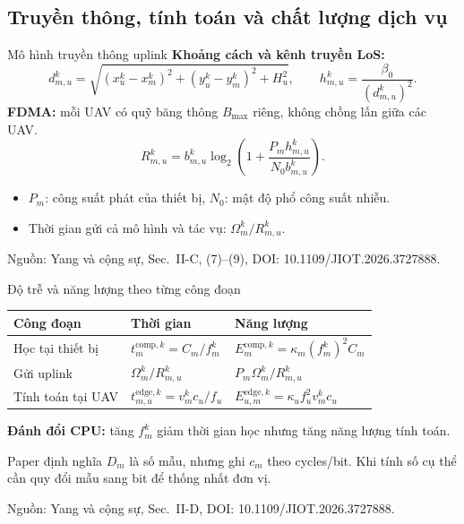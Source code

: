 \documentclass[aspectratio=169,11pt]{beamer}
\newcommand{\source}[1]{\par\vfill{\tiny\color{Muted}Nguồn: #1\par}}
\newcommand{\paperref}[1]{\source{Yang và cộng sự, Sec.~#1, DOI: 10.1109/JIOT.2026.3727888.}}
\begin{document}
\subsection{Truyền thông, tính toán và chất lượng dịch vụ}

\begin{frame}{Mô hình truyền thông uplink}
  \textbf{Khoảng cách và kênh truyền LoS:}
  \[
    d_{m,u}^k=\sqrt{(x_u^k-x_m^k)^2+(y_u^k-y_m^k)^2+H_u^2},
    \qquad h_{m,u}^k=\frac{\beta_0}{(d_{m,u}^k)^2}.
  \]
  \textbf{FDMA:} mỗi UAV có quỹ băng thông $B_{\max}$ riêng, không chồng lấn giữa các UAV.
  \[
    R_{m,u}^k=b_{m,u}^k\log_2\!\left(1+
          \frac{P_mh_{m,u}^k}{N_0b_{m,u}^k}\right).
  \]
  \begin{itemize}
    \item $P_m$: công suất phát của thiết bị, $N_0$: mật độ phổ công suất nhiễu.
    \item Thời gian gửi cả mô hình và tác vụ: $\Omega_m^k/R_{m,u}^k$.
  \end{itemize}
  \paperref{II-C, (7)--(9)}
\end{frame}

\begin{frame}{Độ trễ và năng lượng theo từng công đoạn}
  \par\vspace{0.15cm}
  {\small
  \renewcommand{\arraystretch}{1.8}
  \begin{tabularx}{\textwidth}{@{}lXX@{}}
    \toprule
    \textbf{Công đoạn} & \textbf{Thời gian} & \textbf{Năng lượng}\\
    \midrule
    Học tại thiết bị & $t_m^{\mathrm{comp},k}=C_m/f_m^k$
      & $E_m^{\mathrm{comp},k}=\kappa_m(f_m^k)^2C_m$\\
    Gửi uplink & $\Omega_m^k/R_{m,u}^k$
      & $P_m\Omega_m^k/R_{m,u}^k$\\
    Tính toán tại UAV & $t_{m,u}^{\mathrm{edge},k}=v_m^kc_u/f_u$
      & $E_{u,m}^{\mathrm{edge},k}=\kappa_u f_u^2v_m^kc_u$\\
    \bottomrule
  \end{tabularx}}
  \par\vspace{0.25cm}
  \textbf{Đánh đổi CPU:} tăng $f_m^k$ giảm thời gian học nhưng tăng năng lượng tính toán.
  \par{\footnotesize Paper định nghĩa $D_m$ là số mẫu, nhưng ghi $c_m$ theo cycles/bit. Khi tính số cụ thể cần quy đổi mẫu sang bit để thống nhất đơn vị.}
  \paperref{II-D}
\end{frame}
\end{document}
